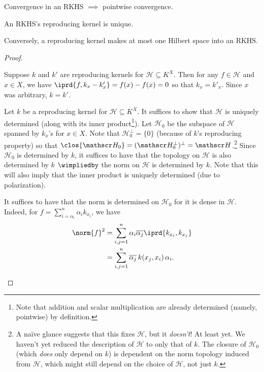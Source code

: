 	
	
	\begin{cor}\label{COR: conv in RKHS implies pointwise convergence}
		Convergence in an RKHS $\implies$ pointwise convergence.
	\end{cor}
	
	
	\begin{thm}\label{THM: RKHS --> rk is injective}
		\leavevmode
		\begin{mylist}
			\item An RKHS's reproducing kernel is unique.
			
			\item Conversely, a reproducing kernel makes at most one Hilbert space into an RKHS.
		\end{mylist}
	\end{thm}
	
	\begin{proof}
		\begin{mylist}
			\item Suppose $k$ and $k'$ are reproducing kernels for $\mathscr H\subseteq K^X$. Then for any $f\in \mathscr H$ and $x\in X$, we have $\iprd{f, k_x - k'_x} = f(x) - f(x) = 0$ so that $k_x = k'_x$. Since $x$ was arbitrary, $k = k'$.
			
			\item Let $k$ be a reproducing kernel for $\mathscr H\subseteq K^X$. It suffices to show that $\mathscr H$ is uniquely determined (along with its inner product\footnote{
				Note that addition and scalar multiplication are already determined (namely, pointwise) by definition.
			}). Let $\mathscr H_0$ be the subspace of $\mathscr H$ spanned by $k_x$'s for $x\in X$. Note that $\mathscr H_0^\perp = \{0\}$ (because of $k$'s reproducing property) so that $\clos{\mathscr H_0} = (\mathscr H_0^\perp)^\perp = \mathscr H$.\footnote{
				A naïve glance suggests that this fixes $\mathscr H$, but it \emph{doesn't}! At least yet. We haven't yet reduced the description of $\mathscr H$ to only that of $k$. The closure of $\mathscr H_0$ (which \emph{does} only depend on $k$) is dependent on the norm topology induced from $\mathscr H$, which might still depend on the choice of $\mathscr H$, not just $k$.
			} Since $\mathscr H_0$ is determined by $k$, it suffices to have that the topology on $\mathscr H$ is also determined by $k$ $\wimpliedby$ the norm on $\mathscr H$ is determined by $k$. Note that this will also imply that the inner product is uniquely determined (due to polarization).
			
			It suffices to have that the norm is determined on $\mathscr H_0$ for it is dense in $\mathscr H$. Indeed, for $f = \sum_{i = \alpha_i}^n \alpha_i k_{x_i}$, we have
			\begin{align*}
				\norm{f}^2
				& = \sum_{i, j = 1}^n \alpha_i \overline{\alpha_j} \iprd{k_{x_i}, k_{x_j}}\\
				& = \sum_{i, j = 1}^n \overline{\alpha_j}\, k(x_j, x_i)\, \alpha_i\text.\tag*{\qedhere}
			\end{align*}
		\end{mylist}
	\end{proof}
	

